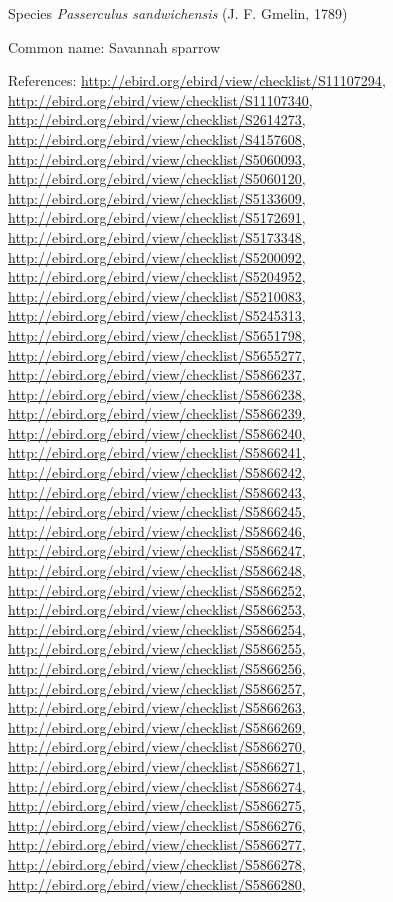 \documentclass[9pt, article]{memoir}
\begin{document}
\begin{multicols}{2}
\vspace{6pt}\noindent\hspace{36pt}Species \textit{Passerculus sandwichensis} (J. F. Gmelin, 1789)


Common name: Savannah sparrow

References: 
\url{http://ebird.org/ebird/view/checklist/S11107294}, 
\url{http://ebird.org/ebird/view/checklist/S11107340}, 
\url{http://ebird.org/ebird/view/checklist/S2614273}, 
\url{http://ebird.org/ebird/view/checklist/S4157608}, 
\url{http://ebird.org/ebird/view/checklist/S5060093}, 
\url{http://ebird.org/ebird/view/checklist/S5060120}, 
\url{http://ebird.org/ebird/view/checklist/S5133609}, 
\url{http://ebird.org/ebird/view/checklist/S5172691}, 
\url{http://ebird.org/ebird/view/checklist/S5173348}, 
\url{http://ebird.org/ebird/view/checklist/S5200092}, 
\url{http://ebird.org/ebird/view/checklist/S5204952}, 
\url{http://ebird.org/ebird/view/checklist/S5210083}, 
\url{http://ebird.org/ebird/view/checklist/S5245313}, 
\url{http://ebird.org/ebird/view/checklist/S5651798}, 
\url{http://ebird.org/ebird/view/checklist/S5655277}, 
\url{http://ebird.org/ebird/view/checklist/S5866237}, 
\url{http://ebird.org/ebird/view/checklist/S5866238}, 
\url{http://ebird.org/ebird/view/checklist/S5866239}, 
\url{http://ebird.org/ebird/view/checklist/S5866240}, 
\url{http://ebird.org/ebird/view/checklist/S5866241}, 
\url{http://ebird.org/ebird/view/checklist/S5866242}, 
\url{http://ebird.org/ebird/view/checklist/S5866243}, 
\url{http://ebird.org/ebird/view/checklist/S5866245}, 
\url{http://ebird.org/ebird/view/checklist/S5866246}, 
\url{http://ebird.org/ebird/view/checklist/S5866247}, 
\url{http://ebird.org/ebird/view/checklist/S5866248}, 
\url{http://ebird.org/ebird/view/checklist/S5866252}, 
\url{http://ebird.org/ebird/view/checklist/S5866253}, 
\url{http://ebird.org/ebird/view/checklist/S5866254}, 
\url{http://ebird.org/ebird/view/checklist/S5866255}, 
\url{http://ebird.org/ebird/view/checklist/S5866256}, 
\url{http://ebird.org/ebird/view/checklist/S5866257}, 
\url{http://ebird.org/ebird/view/checklist/S5866263}, 
\url{http://ebird.org/ebird/view/checklist/S5866269}, 
\url{http://ebird.org/ebird/view/checklist/S5866270}, 
\url{http://ebird.org/ebird/view/checklist/S5866271}, 
\url{http://ebird.org/ebird/view/checklist/S5866274}, 
\url{http://ebird.org/ebird/view/checklist/S5866275}, 
\url{http://ebird.org/ebird/view/checklist/S5866276}, 
\url{http://ebird.org/ebird/view/checklist/S5866277}, 
\url{http://ebird.org/ebird/view/checklist/S5866278}, 
\url{http://ebird.org/ebird/view/checklist/S5866280}, 

\end{multicols}
\end{document}
